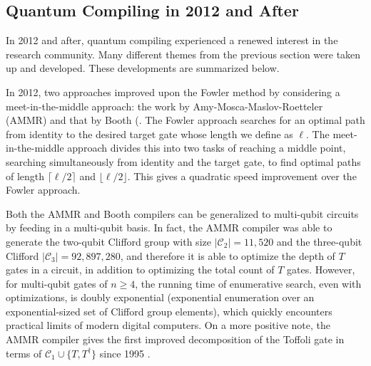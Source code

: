 \subsection{Quantum Compiling in 2012 and After}
\label{subsec:qcompile-post2012}

In 2012 and after, quantum compiling experienced a renewed interest in the
research community. Many different themes from the previous section were
taken up and developed. These developments are summarized below.

In 2012, two approaches improved upon the Fowler method by considering a
meet-in-the-middle approach: the work by Amy-Mosca-Maslov-Roetteler (AMMR)
\cite{Amy2012} and that by Booth (\cite{Booth2012}.
The Fowler approach searches for an
optimal path from identity to the desired target gate whose length 
we define as $\ell$. The meet-in-the-middle approach divides this into two tasks of
reaching a middle point, searching simultaneously from identity and the
target gate, to find optimal paths of length $\lceil \ell/2 \rceil$
and $\lfloor \ell/2 \rfloor$. This gives a quadratic speed improvement over
the Fowler approach.

Both the AMMR and Booth compilers can be generalized to
multi-qubit circuits by feeding in a multi-qubit basis. In fact, the AMMR compiler
was able to generate the two-qubit Clifford group with
size $|\mathcal{C}_2| = 11,520$ and the three-qubit Clifford
$|\mathcal{C}_3| = 92,897,280$, and therefore it is able to optimize
the depth of $T$ gates in a circuit, in addition to optimizing the total
count of $T$ gates. However, for multi-qubit gates of $n \ge 4$,
the running time of enumerative search, even with optimizations, is
doubly exponential (exponential enumeration over an exponential-sized
set of Clifford group elements), which quickly encounters practical limits
of modern digital computers.
On a more positive note, the AMMR compiler gives the first improved decomposition
of the Toffoli gate in terms of $\mathcal{C}_1 \cup \{T, T^{\dagger}\}$
since 1995 \cite{Barenco1995a}.

